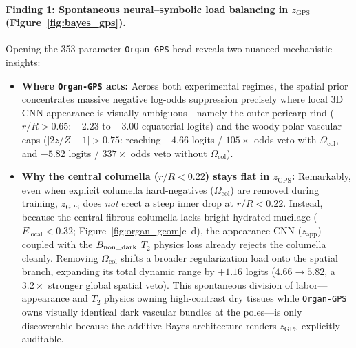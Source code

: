 \documentclass[10pt,a4paper]{article}
\renewcommand{\_}{\origunderscore\allowbreak}
\begin{document}
\paragraph{Finding 1: Spontaneous neural--symbolic load balancing in $z_{\text{GPS}}$ (Figure~\ref{fig:bayes_gps}).}
Opening the 353-parameter \texttt{Organ-GPS} head reveals two nuanced mechanistic insights:
\begin{itemize}
    \item \textbf{Where \texttt{Organ-GPS} acts:} Across both experimental regimes, the spatial prior concentrates massive negative log-odds suppression precisely where local 3D CNN appearance is visually ambiguous---namely the outer pericarp rind ($r/R > 0.65$: $-2.23$ to $-3.00$ equatorial logits) and the woody polar vascular caps ($|2z/Z - 1| > 0.75$: reaching $-4.66$ logits / $105\times$ odds veto with $\Omega_{\text{col}}$, and $-5.82$ logits / $337\times$ odds veto without $\Omega_{\text{col}}$).
    \item \textbf{Why the central columella ($r/R < 0.22$) stays flat in $z_{\text{GPS}}$:} Remarkably, even when explicit columella hard-negatives ($\Omega_{\text{col}}$) are removed during training, $z_{\text{GPS}}$ does \emph{not} erect a steep inner drop at $r/R < 0.22$. Instead, because the central fibrous columella lacks bright hydrated mucilage ($E_{\text{local}} < 0.32$; Figure~\ref{fig:organ_geom}c--d), the appearance CNN ($z_{\text{app}}$) coupled with the $B_{\text{non\_dark}}$ $T_2$ physics loss already rejects the columella cleanly. Removing $\Omega_{\text{col}}$ shifts a broader regularization load onto the spatial branch, expanding its total dynamic range by $+1.16$ logits ($4.66 \to 5.82$, a $3.2\times$ stronger global spatial veto). This spontaneous division of labor---appearance and $T_2$ physics owning high-contrast dry tissues while \texttt{Organ-GPS} owns visually identical dark vascular bundles at the poles---is only discoverable because the additive Bayes architecture renders $z_{\text{GPS}}$ explicitly auditable.
\end{itemize}
\end{document}
